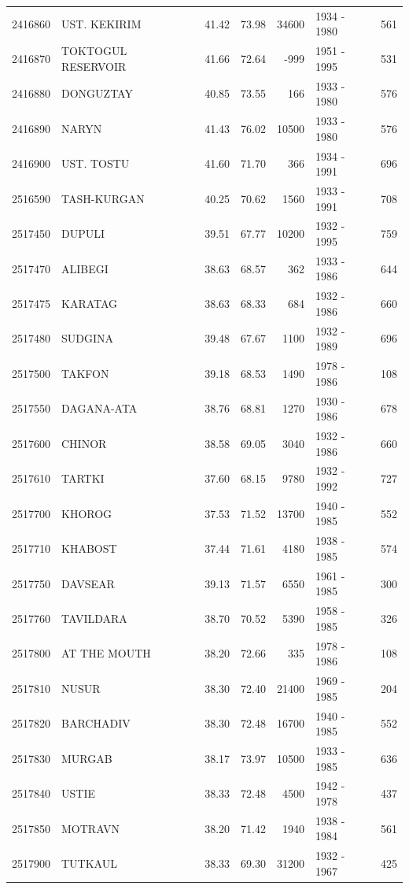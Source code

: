 \begin{longtable}{lp{4.3cm}llrlr}
2416860 & UST. KEKIRIM & 41.42 & 73.98 & 34600 & 1934 - 1980 & 561 \\
2416870 & TOKTOGUL RESERVOIR & 41.66 & 72.64 & -999 & 1951 - 1995 & 531 \\
2416880 & DONGUZTAY & 40.85 & 73.55 & 166 & 1933 - 1980 & 576 \\
2416890 & NARYN & 41.43 & 76.02 & 10500 & 1933 - 1980 & 576 \\
2416900 & UST. TOSTU & 41.60 & 71.70 & 366 & 1934 - 1991 & 696 \\
2516590 & TASH-KURGAN & 40.25 & 70.62 & 1560 & 1933 - 1991 & 708 \\
2517450 & DUPULI & 39.51 & 67.77 & 10200 & 1932 - 1995 & 759 \\
2517470 & ALIBEGI & 38.63 & 68.57 & 362 & 1933 - 1986 & 644 \\
2517475 & KARATAG & 38.63 & 68.33 & 684 & 1932 - 1986 & 660 \\
2517480 & SUDGINA & 39.48 & 67.67 & 1100 & 1932 - 1989 & 696 \\
2517500 & TAKFON & 39.18 & 68.53 & 1490 & 1978 - 1986 & 108 \\
2517550 & DAGANA-ATA & 38.76 & 68.81 & 1270 & 1930 - 1986 & 678 \\
2517600 & CHINOR & 38.58 & 69.05 & 3040 & 1932 - 1986 & 660 \\
2517610 & TARTKI & 37.60 & 68.15 & 9780 & 1932 - 1992 & 727 \\
2517700 & KHOROG & 37.53 & 71.52 & 13700 & 1940 - 1985 & 552 \\
2517710 & KHABOST & 37.44 & 71.61 & 4180 & 1938 - 1985 & 574 \\
2517750 & DAVSEAR & 39.13 & 71.57 & 6550 & 1961 - 1985 & 300 \\
2517760 & TAVILDARA & 38.70 & 70.52 & 5390 & 1958 - 1985 & 326 \\
2517800 & AT THE MOUTH & 38.20 & 72.66 & 335 & 1978 - 1986 & 108 \\
2517810 & NUSUR & 38.30 & 72.40 & 21400 & 1969 - 1985 & 204 \\
2517820 & BARCHADIV & 38.30 & 72.48 & 16700 & 1940 - 1985 & 552 \\
2517830 & MURGAB & 38.17 & 73.97 & 10500 & 1933 - 1985 & 636 \\
2517840 & USTIE & 38.33 & 72.48 & 4500 & 1942 - 1978 & 437 \\
2517850 & MOTRAVN & 38.20 & 71.42 & 1940 & 1938 - 1984 & 561 \\
2517900 & TUTKAUL & 38.33 & 69.30 & 31200 & 1932 - 1967 & 425 \\

\end{longtable}
